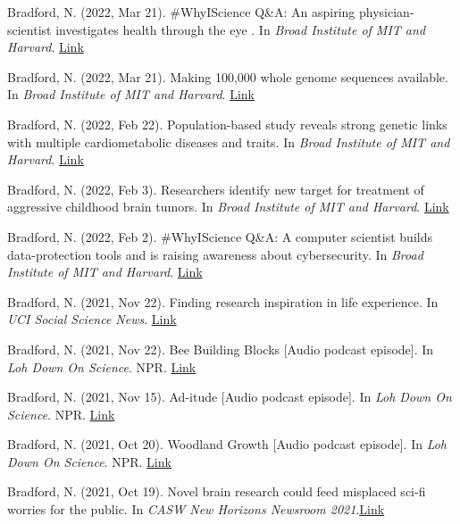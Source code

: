 \documentclass[margin, 10pt]{res} %
\begin{document}
\begin{resume}
Bradford, N. (2022, Mar 21). \#WhyIScience Q\&A: An aspiring physician-scientist investigates health through the eye
. In {\sl Broad Institute of MIT and Harvard}. \href{https://www.broadinstitute.org/blog/whyiscience-qa-aspiring-physician-scientist-investigates-health-through-eye}{Link}

Bradford, N. (2022, Mar 21). Making 100,000 whole genome sequences available. In {\sl Broad Institute of MIT and Harvard}. \href{https://www.broadinstitute.org/news/making-100000-whole-genome-sequences-available}{Link}


Bradford, N. (2022, Feb 22). Population-based study reveals strong genetic links with multiple cardiometabolic diseases and traits. In {\sl Broad Institute of MIT and Harvard}. \href{https://www.broadinstitute.org/news/population-based-study-reveals-strong-genetic-links-multiple-cardiometabolic-diseases-and-0}{Link}

Bradford, N. (2022, Feb 3). Researchers identify new target for treatment of aggressive childhood brain tumors. In {\sl Broad Institute of MIT and Harvard}. \href{https://www.broadinstitute.org/news/researchers-identify-new-target-treatment-aggressive-childhood-brain-tumors}{Link}

Bradford, N. (2022, Feb 2). \#WhyIScience Q\&A: A computer scientist builds data-protection tools and is raising awareness about cybersecurity. In {\sl Broad Institute of MIT and Harvard}. \href{https://www.broadinstitute.org/blog/whyiscience-qa-computer-scientist-builds-data-protection-tools-and-raising-awareness-about}{Link}

Bradford, N. (2021, Nov 22). Finding research inspiration in life experience. In {\sl UCI Social Science News}. \href{https://www.socsci.uci.edu/newsevents/news/2021/2021-11-22-zeinab-kachakeche.php}{Link}

Bradford, N. (2021, Nov 22). Bee Building Blocks [Audio podcast episode]. In {\sl Loh Down On Science}. NPR. \href{https://lohdownonscience.com/bee-building-blocks/}{Link}

Bradford, N. (2021, Nov 15). Ad-itude [Audio podcast episode]. In {\sl Loh Down On Science}. NPR. \href{https://lohdownonscience.com/ad-itude/}{Link}

Bradford, N. (2021, Oct 20). Woodland Growth [Audio podcast episode]. In {\sl Loh Down On Science}. NPR. \href{https://lohdownonscience.com/woodland-growth/}{Link}

Bradford, N. (2021, Oct 19). Novel brain research could feed misplaced sci-fi worries for the public. In {\sl CASW New Horizons Newsroom 2021}.\href{https://casw.org/news/novel-brain-research-could-feed-misplaced-sci-fi-worries-for-the-public/}{Link} 


\end{resume}
\end{document}
